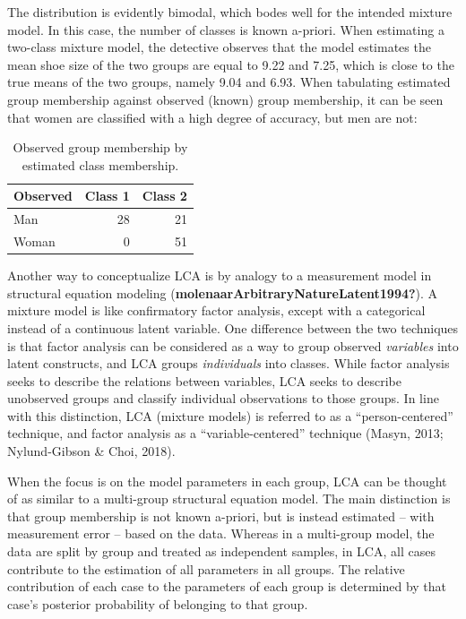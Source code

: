 \documentclass[
  ,man,floatsintext]{apa6}
\begin{document}
The distribution is evidently bimodal, which bodes well for the intended
mixture model. In this case, the number of classes is known a-priori.
When estimating a two-class mixture model, the detective observes that
the model estimates the mean shoe size of the two groups are equal to
9.22 and
7.25, which is close to the true
means of the two groups, namely 9.04
and 6.93. When tabulating estimated
group membership against observed (known) group membership, it can be
seen that women are classified with a high degree of accuracy, but men
are not:

\begin{table}

\caption{\label{tab:tabshoe}Observed group membership by estimated class membership.}
\centering
\begin{tabular}[t]{l|r|r}
\hline
Observed & Class 1 & Class 2\\
\hline
Man & 28 & 21\\
\hline
Woman & 0 & 51\\
\hline
\end{tabular}
\end{table}

Another way to conceptualize LCA is by analogy to a measurement model in structural equation modeling (\textbf{molenaarArbitraryNatureLatent1994?}).
A mixture model is like confirmatory factor analysis,
except with a categorical instead of a continuous latent variable.
One difference between
the two techniques is that factor analysis can be considered as a way to
group observed \emph{variables} into latent constructs, and LCA groups
\emph{individuals} into classes.
While factor analysis seeks to describe the relations between variables,
LCA seeks to describe unobserved groups and classify individual observations to those groups.
In line with this distinction, LCA
(mixture models) is referred to as a ``person-centered'' technique, and
factor analysis as a ``variable-centered'' technique
(Masyn, 2013; Nylund-Gibson \& Choi, 2018).

When the focus is on the model parameters in each group, LCA can be
thought of as similar to a multi-group structural equation model. The
main distinction is that group membership is not known a-priori, but is
instead estimated -- with measurement error -- based on the data.
Whereas in a multi-group model, the data are split by group and treated
as independent samples, in LCA, all cases contribute to the estimation
of all parameters in all groups. The relative contribution of each case
to the parameters of each group is determined by that case's posterior
probability of belonging to that group.
\end{document}
